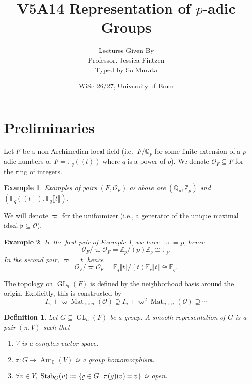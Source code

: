 \documentclass[10pt]{article}
\title{V5A14 Representation of $p$-adic Groups}
\author{Lectures Given By \\ Professor. Jessica Fintzen\\ Typed by So Murata}
\date{WiSe 26/27, University of Bonn}
\newtheorem{definition}{Definition}[section]
\newtheorem{example}{Example}[section]
\numberwithin{equation}{theorem}
\DeclareMathOperator{\Aut}{Aut}
\DeclareMathOperator{\Stab}{Stab}
\DeclareMathOperator{\GL}{GL}
\DeclareMathOperator{\Mat}{Mat}
\newcommand{\defeq}{\vcentcolon=}
\newcommand{\Z}[0]{\mathbb{Z}}
\newcommand{\C}[0]{\mathbb{C}}
\newcommand{\cO}[0]{\mathcal{O}}
\newcommand{\bQ}[0]{\mathbb{Q}}
\newcommand{\bF}[0]{\mathbb{F}}
\begin{document}
\maketitle
\section{Preliminaries}
Let $F$ be a non-Archimedian local field (i.e., $F/\bQ_p$ for some finite extension of a $p$-adic numbers or $F=\bF_q((t))$ where $q$ is a power of $p$).
We denote $\mathcal{O}_F\subseteq F$ for the ring of integers. 
\begin{example}
    \label{example_1_1}
    Examples of pairs $(F,\cO_F)$ as above are $(\bQ_p,\Z_p)$ and $(\bF_q((t)),\bF_q\llbracket t\rrbracket)$.
\end{example}
We will denote $\varpi$ for the uniformizer (i.e., a generator of the unique maximal ideal $\mathfrak{p}\subseteq\mathcal{O}$). 
\begin{example}
    In the first pair of Example \ref{example_1_1}, we have $\varpi = p$, hence
    \begin{equation*}
        \cO_F/\varpi\cO_F = \Z_p/(p)\Z_p \cong \bF_p.
    \end{equation*}
    In the second pair, $\varpi=t$, hence 
    \begin{equation*}
        \cO_F/\varpi\cO_F = \bF_q\llbracket t\rrbracket/(t)\bF_q\llbracket t\rrbracket \cong \bF_q.
    \end{equation*}
\end{example}
\par The topology on $\GL_n(F)$ is defined by the neighborhood basis around the origin. Explicitly, this is constructed by 
\begin{equation*}
    I_n + \varpi\Mat_{n\times n}(\mathcal{O})\supseteq I_n + \varpi^2\Mat_{n\times n}(\mathcal{O})\supseteq\cdots
\end{equation*}
\begin{definition}
Let $G\subseteq\GL_n(F)$ be a group. A smooth representation of $G$ is a pair $(\pi,V)$ such that 
\begin{enumerate}[1.]
\item $V$ is a complex vector space.
\item $\pi:G\to \Aut_\C(V)$ is a group homomorphism.
\item $\forall v\in V$, $\Stab_G(v)\defeq\{g\in G\:|\: \pi(g)(v) =v \}$ is open.
\end{enumerate}
\end{definition}
\end{document}
